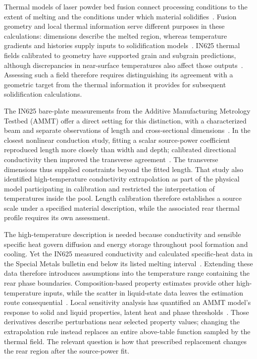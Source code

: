 \documentclass[preprint,12pt]{elsarticle}
\begin{document}
Thermal models of laser powder bed fusion connect processing conditions to the extent of melting and the conditions under which material solidifies~\cite{king2015}. Fusion geometry and local thermal information serve different purposes in these calculations: dimensions describe the melted region, whereas temperature gradients and histories supply inputs to solidification models~\cite{Plotkowski2017Rapid}. IN625 thermal fields calibrated to geometry have supported grain and subgrain predictions, although discrepancies in near-surface temperatures also affect those outputs~\cite{yuan2024}. Assessing such a field therefore requires distinguishing its agreement with a geometric target from the thermal information it provides for subsequent solidification calculations.

The IN625 bare-plate measurements from the Additive Manufacturing Metrology Testbed (AMMT) offer a direct setting for this distinction, with a characterized beam and separate observations of length and cross-sectional dimensions~\cite{lane2020}. In the closest nonlinear conduction study, fitting a scalar source-power coefficient reproduced length more closely than width and depth; calibrated directional conductivity then improved the transverse agreement~\cite{kollmannsberger2019}. The transverse dimensions thus supplied constraints beyond the fitted length. That study also identified high-temperature conductivity extrapolation as part of the physical model participating in calibration and restricted the interpretation of temperatures inside the pool. Length calibration therefore establishes a source scale under a specified material description, while the associated rear thermal profile requires its own assessment.

The high-temperature description is needed because conductivity and sensible specific heat govern diffusion and energy storage throughout pool formation and cooling. Yet the IN625 measured conductivity and calculated specific-heat data in the Special Metals bulletin end below its listed melting interval~\cite{specialmetals625}. Extending these data therefore introduces assumptions into the temperature range containing the rear phase boundaries. Composition-based property estimates provide other high-temperature inputs, while the scatter in liquid-state data leaves the estimation route consequential~\cite{mills2006}. Local sensitivity analysis has quantified an AMMT model's response to solid and liquid properties, latent heat and phase thresholds~\cite{rincon2024}. Those derivatives describe perturbations near selected property values; changing the extrapolation rule instead replaces an entire above-table function sampled by the thermal field. The relevant question is how that prescribed replacement changes the rear region after the source-power fit.
\end{document}
